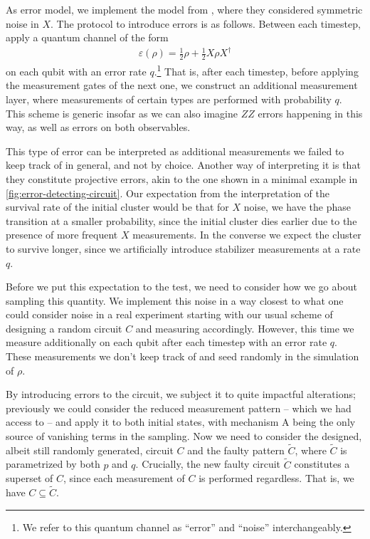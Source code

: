 As error model, we implement the model from
\cite{tikhanovskayaUniversalityCrossEntropy2023}, where they
considered symmetric noise in $X$. The protocol to introduce errors is as
follows. Between each timestep, apply a quantum channel of the form
\begin{align}
  \varepsilon(\rho) = \frac{1}{2}\rho + \frac{1}{2}X\rho X^\dagger
\end{align}
on each qubit with an error rate $q$.\footnote{We refer to this quantum channel
as \enquote{error} and \enquote{noise} interchangeably.} That is, after each timestep, before
applying the measurement gates of the next one, we construct an additional
measurement layer, where measurements of certain types are performed with
probability $q$.  This scheme is generic insofar as we can also imagine $ZZ$
errors happening in this way, as well as errors on both observables.

This type of error can be interpreted as additional measurements we failed to
keep track of in general, and not by choice. Another way of interpreting it is
that they constitute projective errors, akin to the one shown in a minimal
example in \cref{fig:error-detecting-circuit}. Our expectation from the
interpretation of the survival rate of the initial cluster would be that for
$X$ noise, we have the phase transition at a smaller probability, since the
initial cluster dies earlier due to the presence of more frequent $X$
measurements. In the converse we expect the cluster to survive longer, since we
artificially introduce stabilizer measurements at a rate $q$.

Before we put this expectation to the test, we need to consider how we go about
sampling this quantity. We implement this noise in a way closest to what one
could consider noise in a real experiment starting with our usual scheme of
designing a random circuit $C$ and measuring accordingly. However, this time we
measure additionally on each qubit after each timestep with an error rate $q$.
These measurements we don't keep track of and seed randomly in the simulation
of $\rho$.

By introducing errors to the circuit, we subject it to quite impactful
alterations; previously we could consider the reduced measurement
pattern -- which we had access to -- and apply it to both initial states, with
mechanism \textsf{A} being the only source of vanishing terms in the sampling.
Now we need to consider the designed, albeit still randomly generated, circuit $C$
and the faulty pattern $\tilde{C}$, where $\tilde{C}$ is parametrized by both
$p$ and $q$. Crucially, the new faulty circuit $\tilde{C}$ constitutes a
superset of $C$, since each measurement of $C$ is performed regardless. That
is, we have $C\subseteq\tilde{C}$. 

